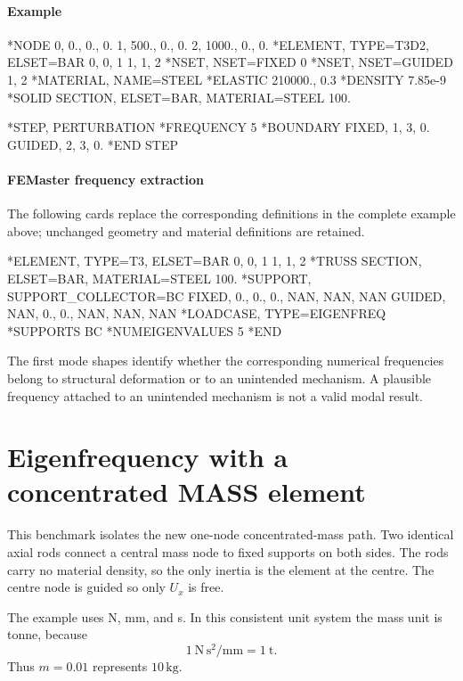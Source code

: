 \paragraph*{Example}

\begin{inputdeck}
*NODE
0,    0., 0., 0.
1,  500., 0., 0.
2, 1000., 0., 0.
*ELEMENT, TYPE=T3D2, ELSET=BAR
0, 0, 1
1, 1, 2
*NSET, NSET=FIXED
0
*NSET, NSET=GUIDED
1, 2
*MATERIAL, NAME=STEEL
*ELASTIC
210000., 0.3
*DENSITY
7.85e-9
*SOLID SECTION, ELSET=BAR, MATERIAL=STEEL
100.

*STEP, PERTURBATION
*FREQUENCY
5
*BOUNDARY
FIXED, 1, 3, 0.
GUIDED, 2, 3, 0.
*END STEP
\end{inputdeck}

\paragraph*{FEMaster frequency extraction}

The following cards replace the corresponding definitions in the
complete example above; unchanged geometry and material definitions
are retained.

\begin{inputdeck}
*ELEMENT, TYPE=T3, ELSET=BAR
0, 0, 1
1, 1, 2
*TRUSS SECTION, ELSET=BAR, MATERIAL=STEEL
100.
*SUPPORT, SUPPORT_COLLECTOR=BC
FIXED, 0., 0., 0., NAN, NAN, NAN
GUIDED, NAN, 0., 0., NAN, NAN, NAN
*LOADCASE, TYPE=EIGENFREQ
*SUPPORTS
BC
*NUMEIGENVALUES
5
*END
\end{inputdeck}

The first mode shapes identify whether the corresponding numerical frequencies belong to structural deformation or to an unintended mechanism. A plausible frequency attached to an unintended mechanism is not a valid modal result.

\section{Eigenfrequency with a concentrated MASS element}

This benchmark isolates the new one-node concentrated-mass path. Two identical axial rods connect a central mass node to fixed supports on both sides. The rods carry no material density, so the only inertia is the  element at the centre. The centre node is guided so only \(U_x\) is free.

The example uses N, mm, and s. In this consistent unit system the mass unit is tonne, because
\[
1\ \mathrm{N}\,\mathrm{s}^2/\mathrm{mm}=1\ \mathrm{t}.
\]
Thus \(m=0.01\) represents \(10\,\mathrm{kg}\).

